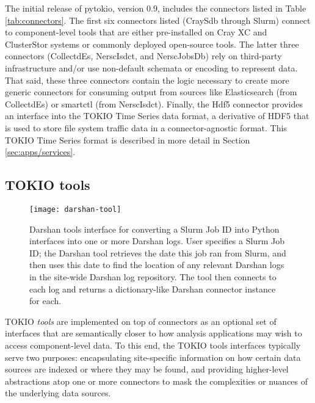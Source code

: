The initial release of pytokio, version 0.9, includes the connectors listed in Table \ref{tab:connectors}.
The first six connectors listed (CraySdb through Slurm) connect to component-level tools that are either pre-installed on Cray XC and ClusterStor systems or commonly deployed open-source tools.
The latter three connectors (\mbox{CollectdEs}, \mbox{NerscIsdct}, and \mbox{NerscJobsDb}) rely on third-party infrastructure and/or use non-default schemata or encoding to represent data.
That said, these three connectors contain the logic necessary to create more generic connectors for consuming output from sources like Elasticsearch (from \mbox{CollectdEs}) or \mbox{smartctl} (from \mbox{NerscIsdct}).
Finally, the Hdf5 connector provides an interface into the TOKIO Time Series data format, a derivative of HDF5 that is used to store file system traffic data in a connector-agnostic format.
This TOKIO Time Series format is described in more detail in Section \ref{sec:apps/services}.

\subsection{TOKIO tools} \label{sec:architecture/tools}

\begin{figure}
    \centering
    \texttt{[image: darshan-tool]}
    \caption{Darshan tools interface for converting a Slurm Job ID into Python interfaces into one or more Darshan logs.
    User specifies a Slurm Job ID; the Darshan tool retrieves the date this job ran from Slurm, and then uses this date to find the location of any relevant Darshan logs in the site-wide Darshan log repository.
    The tool then connects to each log and returns a dictionary-like Darshan connector instance for each.}
    \label{fig:darshan-tool}
    \vspace{-.2in}
\end{figure}

TOKIO \emph{tools} are implemented on top of connectors as an optional set of interfaces that are semantically closer to how analysis applications may wish to access component-level data.
To this end, the TOKIO tools interfaces typically serve two purposes:
encapsulating site-specific information on how certain data sources are indexed or where they may be found, and
providing higher-level abstractions atop one or more connectors to mask the complexities or nuances of the underlying data sources.

